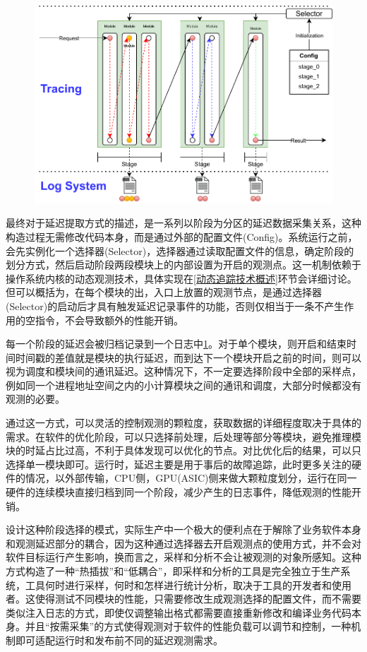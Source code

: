 \documentclass[master,anonymous]{shtthesis}
\begin{document}
\begin{figure}[htbp]
	\centering
	\includegraphics[width=12cm]{img/trace.pdf}
	\label{论文观测机制示意图}
\end{figure}

最终对于延迟提取方式的描述，是一系列以阶段为分区的延迟数据采集关系，这种构造过程无需修改代码本身，而是通过外部的配置文件(Config)。系统运行之前，会先实例化一个选择器(Selector)，选择器通过读取配置文件的信息，确定阶段的划分方式，然后启动阶段两段模块上的内部设置为开启的观测点。这一机制依赖于操作系统内核的动态观测技术，具体实现在\ref{动态追踪技术概述}环节会详细讨论。但可以概括为，在每个模块的出，入口上放置的观测节点，是通过选择器(Selector)的启动后才具有触发延迟记录事件的功能，否则仅相当于一条不产生作用的空指令，不会导致额外的性能开销。

每一个阶段的延迟会被归档记录到一个日志中\ref{论文观测机制示意图}。对于单个模块，则开启和结束时间时间戳的差值就是模块的执行延迟，而到达下一个模块开启之前的时间，则可以视为调度和模块间的通讯延迟。这种情况下，不一定要选择阶段中全部的采样点，例如同一个进程地址空间之内的小计算模块之间的通讯和调度，大部分时候都没有观测的必要。


通过这一方式，可以灵活的控制观测的颗粒度，获取数据的详细程度取决于具体的需求。在软件的优化阶段，可以只选择前处理，后处理等部分等模块，避免推理模块的时延占比过高，不利于具体发现可以优化的节点。对比优化后的结果，可以只选择单一模块即可。运行时，延迟主要是用于事后的故障追踪，此时更多关注的硬件的情况，以外部传输，CPU侧，GPU(ASIC)侧来做大颗粒度划分，运行在同一硬件的连续模块直接归档到同一个阶段，减少产生的日志事件，降低观测的性能开销。

设计这种阶段选择的模式，实际生产中一个极大的便利点在于解除了业务软件本身和观测延迟部分的耦合，因为这种通过选择器去开启观测点的使用方式，并不会对软件目标运行产生影响，换而言之，采样和分析不会让被观测的对象所感知。这种方式构造了一种“热插拔”和“低耦合”，即采样和分析的工具是完全独立于生产系统，工具何时进行采样，何时和怎样进行统计分析，取决于工具的开发者和使用者。这使得测试不同模块的性能，只需要修改生成观测选择的配置文件，而不需要类似注入日志的方式，即使仅调整输出格式都需要直接重新修改和编译业务代码本身。并且“按需采集”的方式使得观测对于软件的性能负载可以调节和控制，一种机制即可适配运行时和发布前不同的延迟观测需求。
\end{document}
